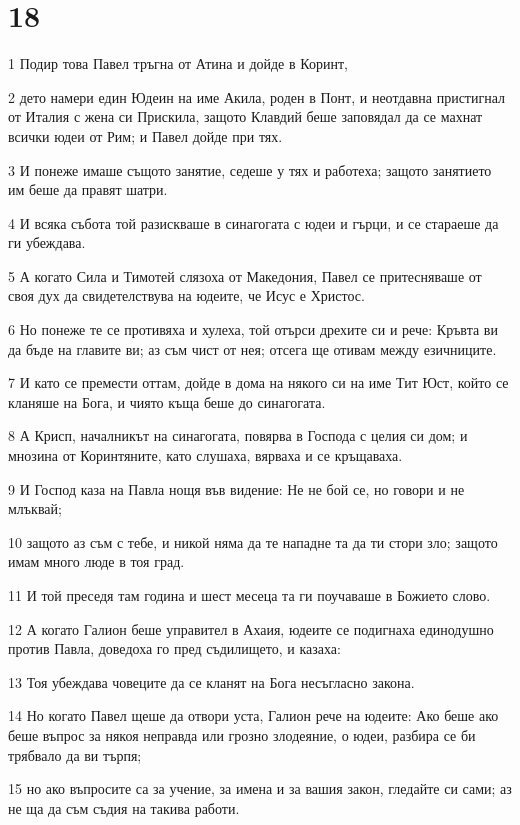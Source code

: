 \chapter{18}

\par 1 Подир това Павел тръгна от Атина и дойде в Коринт,
\par 2 дето намери един Юдеин на име Акила, роден в Понт, и неотдавна пристигнал от Италия с жена си Прискила, защото Клавдий беше заповядал да се махнат всички юдеи от Рим; и Павел дойде при тях.
\par 3 И понеже имаше същото занятие, седеше у тях и работеха; защото занятието им беше да правят шатри.
\par 4 И всяка събота той разискваше в синагогата с юдеи и гърци, и се стараеше да ги убеждава.
\par 5 А когато Сила и Тимотей слязоха от Македония, Павел се притесняваше от своя дух да свидетелствува на юдеите, че Исус е Христос.
\par 6 Но понеже те се противяха и хулеха, той отърси дрехите си и рече: Кръвта ви да бъде на главите ви; аз съм чист от нея; отсега ще отивам между езичниците.
\par 7 И като се премести оттам, дойде в дома на някого си на име Тит Юст, който се кланяше на Бога, и чиято къща беше до синагогата.
\par 8 А Крисп, началникът на синагогата, повярва в Господа с целия си дом; и мнозина от Коринтяните, като слушаха, вярваха и се кръщаваха.
\par 9 И Господ каза на Павла нощя във видение: Не не бой се, но говори и не млъквай;
\par 10 защото аз съм с тебе, и никой няма да те нападне та да ти стори зло; защото имам много люде в тоя град.
\par 11 И той преседя там година и шест месеца та ги поучаваше в Божието слово.
\par 12 А когато Галион беше управител в Ахаия, юдеите се подигнаха единодушно против Павла, доведоха го пред съдилището, и казаха:
\par 13 Тоя убеждава човеците да се кланят на Бога несъгласно закона.
\par 14 Но когато Павел щеше да отвори уста, Галион рече на юдеите: Ако беше ако беше въпрос за някоя неправда или грозно злодеяние, о юдеи, разбира се би трябвало да ви търпя;
\par 15 но ако въпросите са за учение, за имена и за вашия закон, гледайте си сами; аз не ща да съм съдия на такива работи.

